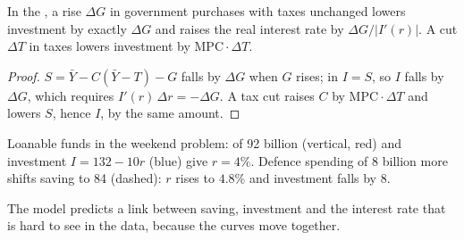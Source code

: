 \begin{proposition}\label{prop:b1:long-run-model:crowding}
In the , a rise $\Delta G$ in government purchases with taxes
unchanged lowers investment by exactly $\Delta G$ and raises the real interest
rate by $\Delta G/|I'(r)|$. A cut $\Delta T$ in taxes lowers investment by $\mathrm{MPC}\cdot\Delta T$.
\end{proposition}

\begin{proof}
$S = \bar Y - C(\bar Y - T) - G$ falls by $\Delta G$ when $G$ rises; in  $I = S$, so $I$
falls by $\Delta G$, which requires $I'(r)\,\Delta r = -\Delta G$. A tax cut raises $C$ by $\mathrm{MPC}\cdot\Delta T$
and lowers $S$, hence $I$, by the same amount.
\end{proof}

\begin{omfigure}

{\small Loanable funds in the weekend problem:  of 92 billion
(vertical, red) and investment $I = 132 - 10r$ (blue) give $r = 4\%$. Defence
spending of 8 billion more shifts saving to 84 (dashed): $r$ rises to $4.8\%$ and
investment falls by 8.}
\end{omfigure}

The model predicts a link between saving, investment and the interest rate
that is hard to see in the data, because the curves move together.

